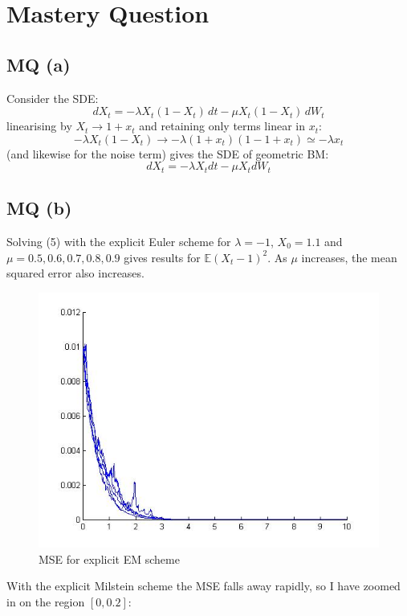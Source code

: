 \documentclass[11pt]{article} %
\begin{document}
\section{Mastery Question}
\subsection{MQ (a)}
Consider the SDE:
\[
	dX_{t} = -\lambda X_{t}(1-X_{t})\,dt - \mu X_{t}(1-X_{t})\,dW_{t}
\]
linearising by $X_{t} \to 1 + x_{t}$ and retaining only terms linear in $x_{t}$:
\[
	-\lambda X_{t}(1-X_{t}) \to -\lambda(1+x_{t})(1 - 1 + x_{t}) \simeq -\lambda x_{t}
\]
(and likewise for the noise term) gives the SDE of geometric BM:
\[
	dX_{t} = -\lambda X_{t}dt - \mu X_{t}dW_{t}
\]
\subsection{MQ (b)}
Solving (5) with the explicit Euler scheme for $\lambda = -1$, $X_{0} = 1.1$ and $\mu = 0.5, 0.6, 0.7, 0.8, 0.9$ gives results for $\mathbb{E}(X_{t} - 1)^{2}$. As $\mu$ increases, the mean squared error also increases.
\begin{figure}
	\centering
		\includegraphics[scale = 0.5]{MQ_exEM.jpg}
		\caption{MSE for explicit EM scheme}
\end{figure}
With the explicit Milstein scheme the MSE falls away rapidly, so I have zoomed in on the region $[0,0.2]$:
\end{document}
